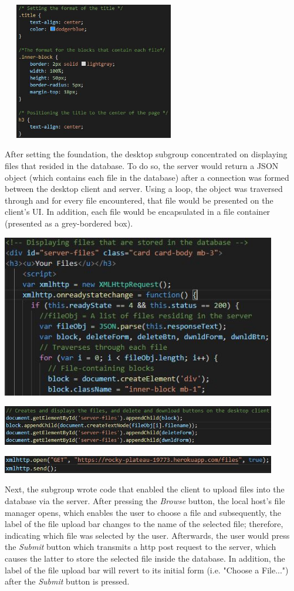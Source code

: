 \documentclass{article}
\begin{document}
\includegraphics[width=8cm, height=6cm]{css}

After setting the foundation, the desktop subgroup concentrated on displaying files that resided in the database. To do so, the server would return a JSON object (which contains each file in the database) after a connection was formed between the desktop client and server. Using a loop, the object was traversed through and for every file encountered, that file would be presented on the client's UI. In addition, each file would be encapsulated in a file container (presented as a grey-bordered box).

\includegraphics[width=12cm]{display1}

\includegraphics[width=12cm]{display2}

\includegraphics[width=12cm]{display3}

Next, the subgroup wrote code that enabled the client to upload files into the database via the server. After pressing the \textit{Browse} button, the local host's file manager opens, which enables the user to choose a file and subsequently, the label of the file upload bar changes to the name of the selected file; therefore, indicating which file was selected by the user. Afterwards, the user would press the \textit{Submit} button which transmits a http post request to the server, which causes the latter to store the selected file inside the database. In addition, the label of the file upload bar will revert to its initial form (i.e. "Choose a File...") after the \textit{Submit} button is pressed. 
\end{document}
